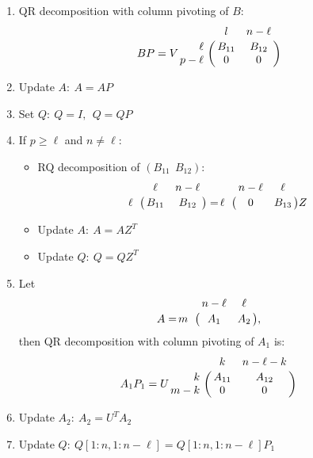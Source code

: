 \begin{enumerate}
            \begin{enumerate}[(1)]
                \item QR decomposition with column pivoting of $B$:
                \begin{displaymath}
                    BP = V\bordermatrix{ & l & n-\ell \cr
                    \hfill \ell & B_{11} & B_{12} \cr
                    \hfill p-\ell & 0 & 0 \cr}
                \end{displaymath}
                \item Update $A: \ A = AP$
                \item Set $Q: \  Q = I, \ \ Q = QP$
                \item If $p \geq \ell$ and $n \neq \ell$:
                    \begin{itemize}
                        \item RQ decomposition of $(B_{11} \ \ B_{12})$:
                            \begin{displaymath}
                                \bordermatrix{ & \ell & n-\ell \cr
                                \hfill \ell & B_{11} & B_{12} \cr}
                                = \bordermatrix{ & n-\ell & \ell \cr
                                \hfill \ell & 0 & B_{13} \cr}Z
                            \end{displaymath}
                        \item Update $A: \ A = AZ^{T}$
                        \item Update $Q: \ Q = QZ^{T}$
                    \end{itemize}
                \item Let
                    \begin{displaymath}
                    A = \bordermatrix{ & n-\ell & \ell \cr
                            \hfill m & A_{1} & A_{2} \cr},
                    \end{displaymath} 
                    then QR decomposition with column pivoting of $A_1$ is:
                     \begin{displaymath}
                        A_{1}P_{1} = U\bordermatrix{ & k & n-\ell-k \cr
                        \hfill k & A_{11} & A_{12} \cr
                        \hfill m-k & 0 & 0 \cr}
                    \end{displaymath}
                \item Update $A_{2}: \ A_{2} = U^{T}A_{2}$
                \item Update $Q: \ Q[1:n, 1:n-\ell] = Q[1:n, 1:n-\ell]P_{1}$

\end{enumerate}
\end{enumerate}
